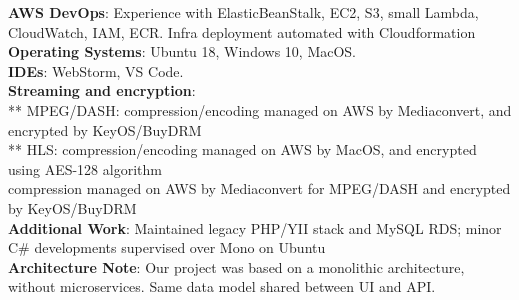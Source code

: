 \documentclass[
  a4paper,
   maincolor=cvblue,
   sectioncolor=cvblue,
]{fortysecondscv}
\begin{document}
\begin{cvtable}
{      \textbf{AWS DevOps}: Experience with ElasticBeanStalk, EC2, S3, small Lambda, CloudWatch, IAM, ECR. Infra deployment automated with Cloudformation\\
      \textbf{Operating Systems}: Ubuntu 18, Windows 10, MacOS.\\
      \textbf{IDEs}: WebStorm, VS Code.\\
      \textbf{Streaming and encryption}:\\
         ** MPEG/DASH: compression/encoding managed on AWS by Mediaconvert, and encrypted by KeyOS/BuyDRM\\
         ** HLS: compression/encoding managed on AWS by MacOS, and encrypted using AES-128 algorithm\\
      compression managed on AWS by Mediaconvert for MPEG/DASH and encrypted by KeyOS/BuyDRM\\
      \textbf{Additional Work}: Maintained legacy PHP/YII stack and MySQL RDS; minor C\# developments supervised over Mono on Ubuntu\\
      \textbf{Architecture Note}: Our project was based on a monolithic architecture, without microservices. Same data model shared between UI and API.
    }
\end{cvtable}













\newpage
\makebacksidebar
\end{document}
